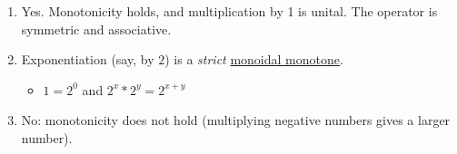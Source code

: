 \begin{enumerate}
    \item   Yes. Monotonicity holds, and multiplication by 1 is unital. The operator is symmetric and associative.
    \item Exponentiation (say, by $2$) is a \emph{strict} \hyperref[D2.41]{monoidal monotone}.
          \begin{itemize}
            \item $1 = 2^0$ and $2^x * 2^y = 2^{x+y}$
          \end{itemize}
    \item No: monotonicity does not hold (multiplying negative numbers gives a larger number).

  \end{enumerate}
